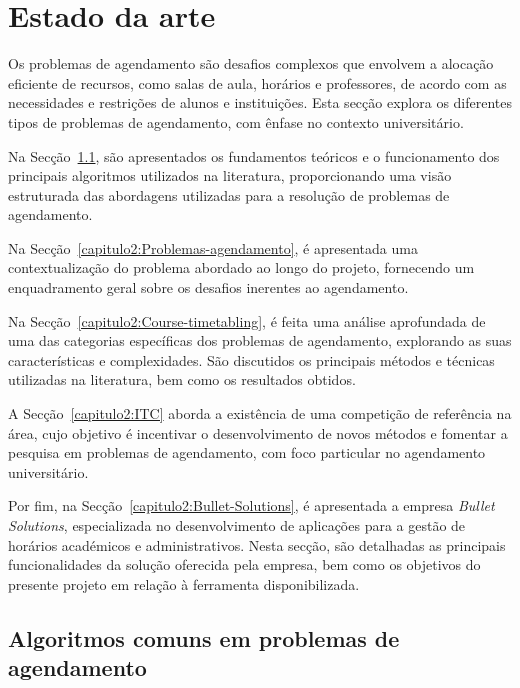 % 
%  
%
\chapter{Estado da arte}
\label{capitulo:estado-arte}

Os problemas de agendamento são desafios complexos que envolvem a alocação eficiente de recursos, como salas de aula, horários e professores, de acordo com as necessidades e restrições de alunos e instituições. Esta secção explora os diferentes tipos de problemas de agendamento, com ênfase no contexto universitário.

Na Secção~\ref{capitulo2:Teoria-funcionamento-algoritmos}, são apresentados os fundamentos teóricos e o funcionamento dos principais algoritmos utilizados na literatura, proporcionando uma visão estruturada das abordagens utilizadas para a resolução de problemas de agendamento.

Na Secção~\ref{capitulo2:Problemas-agendamento}, é apresentada uma contextualização do problema abordado ao longo do projeto, fornecendo um enquadramento geral sobre os desafios inerentes ao agendamento.

Na Secção~\ref{capitulo2:Course-timetabling}, é feita uma análise aprofundada de uma das categorias específicas dos problemas de agendamento, explorando as suas características e complexidades. São discutidos os principais métodos e técnicas utilizadas na literatura, bem como os resultados obtidos.

A Secção~\ref{capitulo2:ITC} aborda a existência de uma competição de referência na área, cujo objetivo é incentivar o desenvolvimento de novos métodos e fomentar a pesquisa em problemas de agendamento, com foco particular no agendamento universitário.

Por fim, na Secção~\ref{capitulo2:Bullet-Solutions}, é apresentada a empresa \textit{Bullet Solutions}, especializada no desenvolvimento de aplicações para a gestão de horários académicos e administrativos. Nesta secção, são detalhadas as principais funcionalidades da solução oferecida pela empresa, bem como os objetivos do presente projeto em relação à ferramenta disponibilizada.

\section{Algoritmos comuns em problemas de agendamento}
\label{capitulo2:Teoria-funcionamento-algoritmos}

